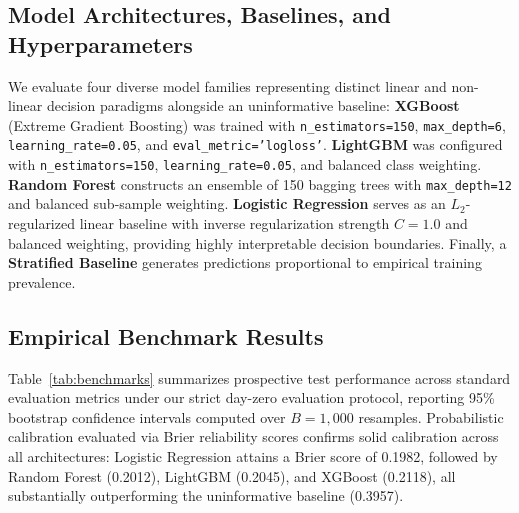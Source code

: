 \documentclass[final,5p,times,twocolumn]{elsarticle}
\begin{document}
\subsection{Model Architectures, Baselines, and Hyperparameters}
We evaluate four diverse model families representing distinct linear and non-linear decision paradigms alongside an uninformative baseline:
\textbf{XGBoost} (Extreme Gradient Boosting) was trained with \texttt{n\_estimators=150}, \texttt{max\_depth=6}, \texttt{learning\_rate=0.05}, and \texttt{eval\_metric='logloss'}.
\textbf{LightGBM} was configured with \texttt{n\_estimators=150}, \texttt{learning\_rate=0.05}, and balanced class weighting.
\textbf{Random Forest} constructs an ensemble of 150 bagging trees with \texttt{max\_depth=12} and balanced sub-sample weighting.
\textbf{Logistic Regression} serves as an $L_2$-regularized linear baseline with inverse regularization strength $C = 1.0$ and balanced weighting, providing highly interpretable decision boundaries.
Finally, a \textbf{Stratified Baseline} generates predictions proportional to empirical training prevalence.

\subsection{Empirical Benchmark Results}
Table~\ref{tab:benchmarks} summarizes prospective test performance across standard evaluation metrics under our strict day-zero evaluation protocol, reporting 95\% bootstrap confidence intervals computed over $B = 1,000$ resamples. Probabilistic calibration evaluated via Brier reliability scores confirms solid calibration across all architectures: Logistic Regression attains a Brier score of 0.1982, followed by Random Forest (0.2012), LightGBM (0.2045), and XGBoost (0.2118), all substantially outperforming the uninformative baseline (0.3957).
\end{document}
